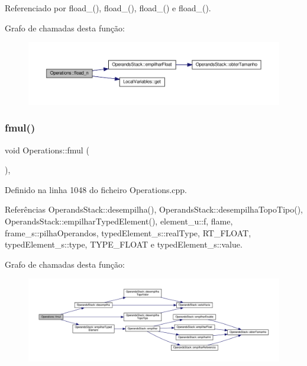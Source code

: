 Referenciado por fload\+\_(), fload\+\_(), fload\+\_() e fload\+\_().

Grafo de chamadas desta função\+:
\nopagebreak
\begin{figure}[H]
\begin{center}
\leavevmode
\includegraphics[width=350pt]{classOperations_af466511fbbf8fd71f6dd31b0433df181_cgraph}
\end{center}
\end{figure}
\mbox{\label{classOperations_ad4caf68c912edd7bfac5c8d74c1e2036}} 
\subsubsection{\texorpdfstring{fmul()}{fmul()}}
{\footnotesize\ttfamily void Operations\+::fmul (\begin{DoxyParamCaption}{ }\end{DoxyParamCaption})\hspace{0.3cm}{\ttfamily [static]}, {\ttfamily [private]}}



Definido na linha 1048 do ficheiro Operations.\+cpp.



Referências Operands\+Stack\+::desempilha(), Operands\+Stack\+::desempilha\+Topo\+Tipo(), Operands\+Stack\+::empilhar\+Typed\+Element(), element\+\_\+u\+::f, flame, frame\+\_\+s\+::pilha\+Operandos, typed\+Element\+\_\+s\+::real\+Type, R\+T\+\_\+\+F\+L\+O\+AT, typed\+Element\+\_\+s\+::type, T\+Y\+P\+E\+\_\+\+F\+L\+O\+AT e typed\+Element\+\_\+s\+::value.

Grafo de chamadas desta função\+:
\nopagebreak
\begin{figure}[H]
\begin{center}
\leavevmode
\includegraphics[width=350pt]{classOperations_ad4caf68c912edd7bfac5c8d74c1e2036_cgraph}
\end{center}
\end{figure}
\mbox{\label{classOperations_a17a7d8f333373d30ae5b1595d96594e5}} 
